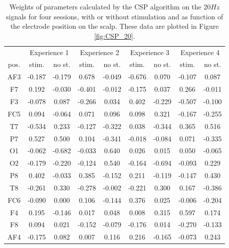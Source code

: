\documentclass[smallextended]{svjour3}
\begin{document}
\begin{table}[]
\centering
\caption{Weights of parameters calculated by the CSP algorithm on the 20$Hz$ signals for four sessions, with or without stimulation and as function of the electrode position on the scalp. These data are plotted in Figure \ref{fig:CSP_20}.}
\label{my-label}
\begin{tabular}{|c|c|c|c|c|c|c|c|c|}
\hline
&\multicolumn{2}{c|}{Experience 1}&\multicolumn{2}{c|}{Experience 2}&\multicolumn{2}{c|}{Experience 3}&\multicolumn{2}{c|}{Experience 4}\\
pos.&stim.&no st.&stim.&no st.&stim.&no st.&stim.&no st.\\
\hline
AF3&-0.187&-0.179&0.678&-0.049&-0.676&0.070&-0.107&0.087\\
F7&0.192&-0.030&-0.401&-0.012&-0.175&0.037&0.266&-0.011\\
F3&-0.078&0.087&-0.266&0.034&0.402&-0.229&-0.507&-0.100\\
FC5&0.094&-0.064&0.071&0.096&0.098&0.321&-0.167&-0.255\\
T7&-0.534&0.233&-0.127&-0.322&0.038&-0.344&0.365&0.516\\
P7&0.527&0.500&0.104&-0.341&-0.018&-0.084&0.071&-0.335\\
O1&-0.062&-0.682&-0.033&0.640&0.026&0.015&0.050&-0.065\\
\hline
O2&-0.179&-0.220&-0.124&0.540&-0.164&-0.694&-0.093&0.229\\
P8&0.402&-0.033&0.385&-0.152&0.211&-0.119&-0.147&0.430\\
T8&-0.261&0.330&-0.278&-0.002&-0.221&0.300&0.167&-0.386\\
FC6&-0.090&0.000&0.106&-0.144&0.376&0.025&-0.006&-0.204\\
F4&0.195&-0.146&0.017&0.048&0.008&0.315&0.597&0.174\\
F8&0.094&0.021&-0.152&-0.079&-0.176&0.014&-0.270&-0.133\\
AF4&-0.175&0.082&0.007&0.116&0.216&-0.165&-0.073&0.243\\ 
\hline
\end{tabular}\label{table:CSP_20}
\end{table} 
\end{document}
